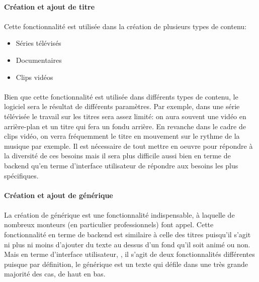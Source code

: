 \paragraph{Création et ajout de titre}

\paragraph{}

Cette fonctionnalité est utilisée dans la création de plusieurs types
de contenu:

\begin{itemize} \setlength{\itemsep}{2mm}

  \item {Séries télévisés}

  \item {Documentaires}

  \item {Clips vidéos}

\end{itemize}

\paragraph{}

Bien que cette fonctionnalité est utilisée dans différents types de
contenu, le logiciel sera le résultat de différents paramètres. Par
exemple, dans une série télévisée le travail sur les titres sera
assez limité: on aura souvent une vidéo en arrière-plan et un titre
qui fera un fondu arrière. En revanche dans le cadre de clips vidéo,
on verra fréquemment le titre en mouvement sur le rythme de la musique
par exemple. Il est nécessaire de tout mettre en oeuvre pour répondre
à la diversité de ces besoins mais il sera plus difficile aussi bien
en terme de backend qu'en terme d'interface utilisateur de répondre
aux besoins les plus spécifiques.

\paragraph{Création et ajout de générique}

\paragraph{}

La création de générique est une fonctionnalité indispensable,
à laquelle de nombreux monteurs (en particulier professionnels)
font appel. Cette fonctionnalité en terme de backend est similaire à
celle des titres puisqu'il s'agit ni plus ni moins d'ajouter du texte
au dessus d'un fond qu'il soit animé ou non. Mais en terme d'interface
utilisateur, , il s'agit
de deux fonctionnalités différentes puisque par définition, le
générique est un texte qui défile dans une très grande majorité
des cas, de haut en bas.

